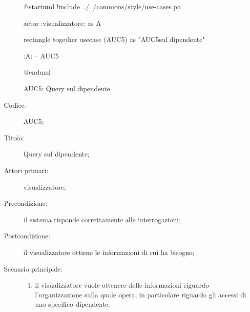 \documentclass[../../../analisi-dei-requisiti.tex]{subfiles}
\begin{document}
\begin{figure}[H]
  \centering
  \begin{plantuml}
  @startuml
  !include ../../commons/style/use-cases.pu

  actor :visualizzatore: as A

  rectangle {
    together {
      usecase (AUC5) as "AUC5\nQuery sul dipendente"
    }
  }

  :A: -- AUC5

  @enduml
  \end{plantuml}
  \caption{AUC5: Query sul dipendente}%
  \label{fig:AUC5}
\end{figure}

\begin{description}
  \item[Codice:] AUC5;
  \item[Titolo:] Query sul dipendente;
  \item[Attori primari:] visualizzatore;
  \item[Precondizione:] il sistema risponde correttamente alle interrogazioni;
  \item[Postcondizione:] il visualizzatore ottiene le informazioni di cui ha bisogno;
  \item[Scenario principale:]
  \begin{enumerate}
    \item il visualizzatore vuole ottenere delle informazioni riguardo l'organizzazione sulla quale opera, in particolare riguardo gli accessi di uno specifico dipendente.
  \end{enumerate}
\end{description}
\end{document}
